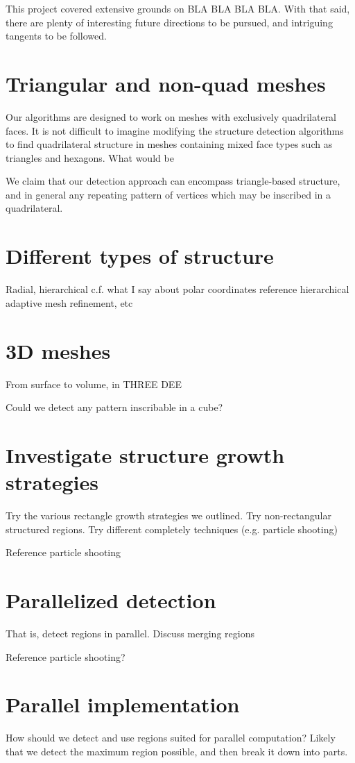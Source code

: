 This project covered extensive grounds on BLA BLA BLA BLA. With that said, there are plenty of interesting future directions to be pursued, and intriguing tangents to be followed.

\section{Triangular and non-quad meshes}
Our algorithms are designed to work on meshes with exclusively quadrilateral faces. It is not difficult to imagine modifying the structure detection algorithms to find quadrilateral structure in meshes containing mixed face types such as triangles and hexagons. What would be

We claim that our detection approach can encompass triangle-based structure, and in general any repeating pattern of vertices which may be inscribed in a quadrilateral.


\section{Different types of structure}
Radial, hierarchical
c.f. what I say about polar coordinates
reference hierarchical adaptive mesh refinement, etc

\section{3D meshes}
From surface to volume, in THREE DEE

Could we detect any pattern inscribable in a cube?

\section{Investigate structure growth strategies}
Try the various rectangle growth strategies we outlined.
Try non-rectangular structured regions.
Try different completely techniques (e.g. particle shooting)

Reference particle shooting

\section{Parallelized detection}
That is, detect regions in parallel. Discuss merging regions

Reference particle shooting?


\section{Parallel implementation}
How should we detect and use regions suited for parallel computation?
Likely that we detect the maximum region possible, and then break it down into parts.

